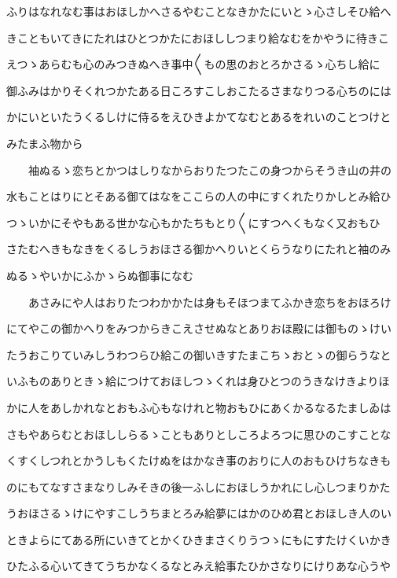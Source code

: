 \documentclass[a4paper,11pt,landscape]{ltjtarticle}
\begin{document}
\par\medskip
ふりはなれなむ事はおほしかへさるやむことなきかたにいとゝ心さしそひ給へ
\par\medskip
きこともいてきにたれはひとつかたにおほししつまり給なむをかやうに待きこ
\par\medskip
えつゝあらむも心のみつきぬへき事中〱もの思のおとろかさるゝ心ちし給に
\par\medskip
御ふみはかりそくれつかたある日ころすこしおこたるさまなりつる心ちのには
\par\medskip
かにいといたうくるしけに侍るをえひきよかてなむとあるをれいのことつけと
\par\medskip
みたまふ物から
\par\medskip
　　袖ぬるゝ恋ちとかつはしりなからおりたつたこの身つからそうき山の井の
\par\medskip
水もことはりにとそある御てはなをここらの人の中にすくれたりかしとみ給ひ
\par\medskip
つゝいかにそやもある世かな心もかたちもとり〱にすつへくもなく又おもひ
\par\medskip
さたむへきもなきをくるしうおほさる御かへりいとくらうなりにたれと袖のみ
\par\medskip
ぬるゝやいかにふかゝらぬ御事になむ
\par\medskip
　　あさみにや人はおりたつわかかたは身もそほつまてふかき恋ちをおほろけ
\par\medskip
にてやこの御かへりをみつからきこえさせぬなとありおほ殿には御ものゝけい
\par\medskip
たうおこりていみしうわつらひ給この御いきすたまこちゝおとゝの御らうなと
\par\medskip
いふものありときゝ給につけておほしつゝくれは身ひとつのうきなけきよりほ
\par\medskip
かに人をあしかれなとおもふ心もなけれと物おもひにあくかるなるたましゐは
\par\medskip
さもやあらむとおほししらるゝこともありとしころよろつに思ひのこすことな
\par\medskip
くすくしつれとかうしもくたけぬをはかなき事のおりに人のおもひけちなきも
\par\medskip
のにもてなすさまなりしみそきの後一ふしにおほしうかれにし心しつまりかた
\par\medskip
うおほさるゝけにやすこしうちまとろみ給夢にはかのひめ君とおほしき人のい
\par\medskip
ときよらにてある所にいきてとかくひきまさくりうつゝにもにすたけくいかき
\par\medskip
ひたふる心いてきてうちかなくるなとみえ給事たひかさなりにけりあな心うや
\end{document}
